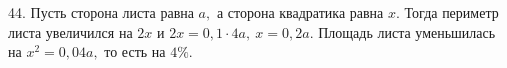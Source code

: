 44. Пусть сторона листа равна $a,$ а сторона квадратика равна $x.$ Тогда периметр листа увеличился на $2x$ и $2x=0,1\cdot4a,\ x=0,2a.$ Площадь листа уменьшилась на $x^2=0,04a,$ то есть на $4\%.$\\
